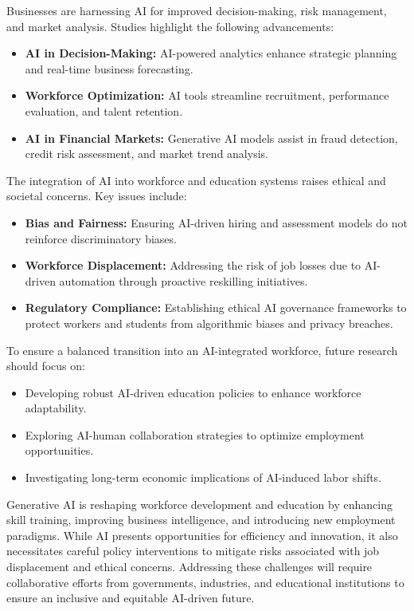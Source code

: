 \documentclass[a4paper,headinclude=on,footinclude=on,12pt,oneside]{scrbook}
\begin{document}

Businesses are harnessing AI for improved decision-making, risk management, and market analysis. Studies highlight the following advancements:
\begin{itemize}
	\item \textbf{AI in Decision-Making:} AI-powered analytics enhance strategic planning and real-time business forecasting.
	\item \textbf{Workforce Optimization:} AI tools streamline recruitment, performance evaluation, and talent retention.
	\item \textbf{AI in Financial Markets:} Generative AI models assist in fraud detection, credit risk assessment, and market trend analysis.
\end{itemize}


The integration of AI into workforce and education systems raises ethical and societal concerns. Key issues include:
\begin{itemize}
	\item \textbf{Bias and Fairness:} Ensuring AI-driven hiring and assessment models do not reinforce discriminatory biases.
	\item \textbf{Workforce Displacement:} Addressing the risk of job losses due to AI-driven automation through proactive reskilling initiatives.
	\item \textbf{Regulatory Compliance:} Establishing ethical AI governance frameworks to protect workers and students from algorithmic biases and privacy breaches.
\end{itemize}


To ensure a balanced transition into an AI-integrated workforce, future research should focus on:
\begin{itemize}
	\item Developing robust AI-driven education policies to enhance workforce adaptability.
	\item Exploring AI-human collaboration strategies to optimize employment opportunities.
	\item Investigating long-term economic implications of AI-induced labor shifts.
\end{itemize}


Generative AI is reshaping workforce development and education by enhancing skill training, improving business intelligence, and introducing new employment paradigms. While AI presents opportunities for efficiency and innovation, it also necessitates careful policy interventions to mitigate risks associated with job displacement and ethical concerns. Addressing these challenges will require collaborative efforts from governments, industries, and educational institutions to ensure an inclusive and equitable AI-driven future.
\end{document}
